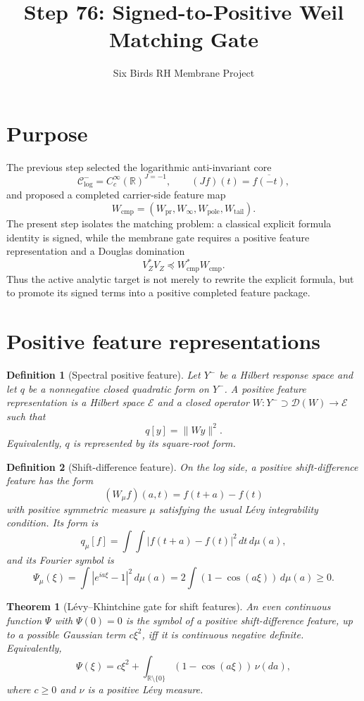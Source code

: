 \documentclass[11pt]{article}
\title{Step 76: Signed-to-Positive Weil Matching Gate}
\author{Six Birds RH Membrane Project}
\date{}
\newtheorem{theorem}{Theorem}
\newtheorem{definition}{Definition}
\begin{document}
\maketitle

\section{Purpose}
The previous step selected the logarithmic anti-invariant core
\[
\mathcal C^-_{\log}=C_c^\infty(\mathbb R)^{J=-1},\qquad (Jf)(t)=\overline{f(-t)},
\]
and proposed a completed carrier-side feature map
\[
W_{\mathrm{cmp}}=(W_{\mathrm{pr}},W_\infty,W_{\mathrm{pole}},W_{\mathrm{tail}}).
\]
The present step isolates the matching problem: a classical explicit formula identity is signed, while the membrane gate requires a positive feature representation and a Douglas domination
\[
V_Z^*V_Z\preceq W_{\mathrm{cmp}}^*W_{\mathrm{cmp}}.
\]
Thus the active analytic target is not merely to rewrite the explicit formula, but to promote its signed terms into a positive completed feature package.

\section{Positive feature representations}
\begin{definition}[Spectral positive feature]
Let $Y^-$ be a Hilbert response space and let $q$ be a nonnegative closed quadratic form on $Y^-$. A positive feature representation is a Hilbert space $\mathcal E$ and a closed operator $W:Y^-\supset\mathcal D(W)\to\mathcal E$ such that
\[
q[y]=\|Wy\|^2.
\]
Equivalently, $q$ is represented by its square-root form.
\end{definition}

\begin{definition}[Shift-difference feature]
On the log side, a positive shift-difference feature has the form
\[
(W_\mu f)(a,t)=f(t+a)-f(t)
\]
with positive symmetric measure $\mu$ satisfying the usual Lévy integrability condition. Its form is
\[
q_\mu[f]=\int\!\int |f(t+a)-f(t)|^2\,dt\,d\mu(a),
\]
and its Fourier symbol is
\[
\Psi_\mu(\xi)=\int |e^{ia\xi}-1|^2\,d\mu(a)=2\int(1-\cos(a\xi))\,d\mu(a)\ge0.
\]
\end{definition}

\begin{theorem}[Lévy--Khintchine gate for shift features]
An even continuous function $\Psi$ with $\Psi(0)=0$ is the symbol of a positive shift-difference feature, up to a possible Gaussian term $c\xi^2$, iff it is continuous negative definite. Equivalently,
\[
\Psi(\xi)=c\xi^2+\int_{\mathbb R\setminus\{0\}}(1-\cos(a\xi))\,\nu(da),
\]
where $c\ge0$ and $\nu$ is a positive Lévy measure.
\end{theorem}
\end{document}
